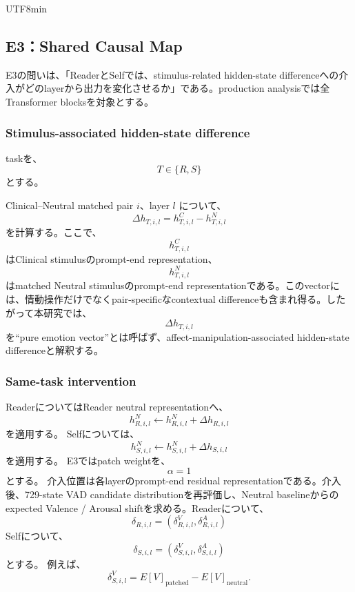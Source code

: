 \documentclass{article} %
\begin{document}
\begin{CJK*}{UTF8}{min}
\subsection{E3：Shared Causal Map}
\label{app:v1-e3}

E3の問いは、「ReaderとSelfでは、stimulus-related hidden-state differenceへの介入がどのlayerから出力を変化させるか」である。production analysisでは全Transformer blocksを対象とする。


\subsubsection{Stimulus-associated hidden-state difference}

taskを、
\[
T\in\{R,S\}
\]
とする。

Clinical--Neutral matched pair \(i\)、layer \(l\) について、
\[
\Delta h_{T,i,l}
=
h_{T,i,l}^{C}
-
h_{T,i,l}^{N}
\]
を計算する。ここで、
\[
h_{T,i,l}^{C}
\]
はClinical stimulusのprompt-end representation、
\[
h_{T,i,l}^{N}
\]
はmatched Neutral stimulusのprompt-end representationである。このvectorには、情動操作だけでなくpair-specificなcontextual differenceも含まれ得る。したがって本研究では、
\[
\Delta h_{T,i,l}
\]
を``pure emotion vector''とは呼ばず、affect-manipulation-associated hidden-state differenceと解釈する。


\subsubsection{Same-task intervention}

ReaderについてはReader neutral representationへ、
\[
h_{R,i,l}^{N}
\leftarrow
h_{R,i,l}^{N}
+
\Delta h_{R,i,l}
\]
を適用する。
Selfについては、
\[
h_{S,i,l}^{N}
\leftarrow
h_{S,i,l}^{N}
+
\Delta h_{S,i,l}
\]
を適用する。
E3ではpatch weightを、
\[
\alpha=1
\]
とする。
介入位置は各layerのprompt-end residual representationである。介入後、729-state VAD candidate distributionを再評価し、Neutral baselineからのexpected Valence / Arousal shiftを求める。Readerについて、
\[
\delta_{R,i,l}
=
\left(
\delta^V_{R,i,l},
\delta^A_{R,i,l}
\right)
\]
Selfについて、
\[
\delta_{S,i,l}
=
\left(
\delta^V_{S,i,l},
\delta^A_{S,i,l}
\right)
\]
とする。
例えば、
\[
\delta^V_{S,i,l}
=
E[V]_{\mathrm{patched}}
-
E[V]_{\mathrm{neutral}}.
\]



\end{CJK*}
\end{document}
